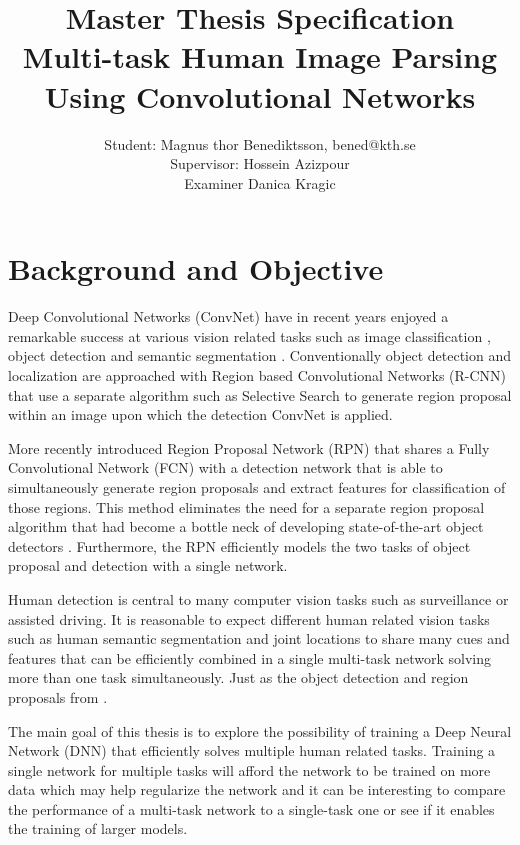 \documentclass[a4paper,10pt]{article}
\title{Master Thesis Specification \\ Multi-task Human Image Parsing Using Convolutional Networks}
\author{Student: Magnus thor Benediktsson, bened@kth.se \\ Supervisor: Hossein Azizpour \\ Examiner Danica Kragic}
\begin{document}
\maketitle



\section{Background and Objective}

Deep Convolutional Networks (ConvNet) have in recent years enjoyed a remarkable success at various vision related tasks such as image classification \cite{He2015,Szegedy2014,Krizhevsky2012}, object detection \cite{Ren2015} and semantic segmentation \cite{Long2014,Noh2015}. Conventionally object detection and localization are approached with Region based Convolutional Networks (R-CNN) \cite{Girshick2014} that use a separate algorithm such as Selective Search \cite{Uijlings2013} to generate region proposal within an image upon which the detection ConvNet is applied.  


More recently \cite{Ren2015} introduced Region Proposal Network (RPN) that shares a Fully Convolutional Network (FCN) \cite{Long2014} with a detection network that is able to simultaneously generate region proposals and extract features for classification of those regions.  This method eliminates the need for a separate region proposal algorithm that had become a bottle neck of developing state-of-the-art object detectors \cite{Ren2015}.  Furthermore, the RPN efficiently models the two tasks of object proposal and detection with a single network.

Human detection is central to many computer vision tasks such as surveillance or assisted driving. It is reasonable to expect different human related vision tasks such as human semantic segmentation \cite{Long2014,Noh2015} and joint locations \cite{Tompson2015,Wei2016} to share many cues and features that can be efficiently combined in a single multi-task network solving more than one task simultaneously.  Just as the object detection and region proposals from \cite{Ren2015}.

The main goal of this thesis is to explore the possibility of training a Deep Neural Network (DNN) that efficiently solves multiple human related tasks.  Training a single network for multiple tasks will afford the network to be trained on more data which may help regularize the network and it can be interesting to compare the performance of a multi-task network to a single-task one or see if it enables the training of larger models.
\end{document}
